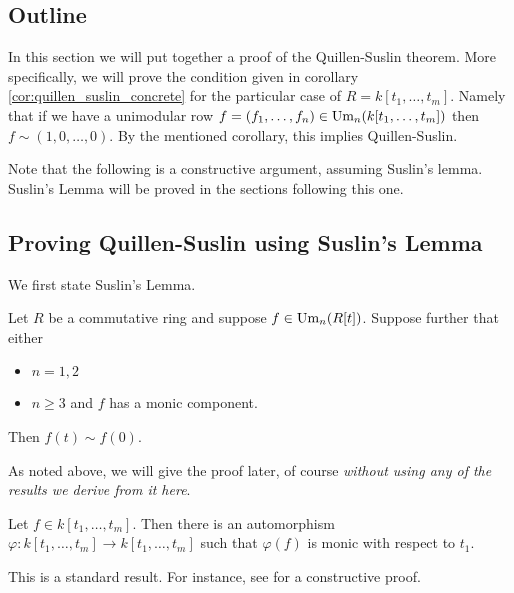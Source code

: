\subsection{Outline}
In this section we will put together a proof of the Quillen-Suslin theorem.
More specifically, we will prove the condition given in corollary \ref{cor:quillen_suslin_concrete} for the particular case of $R = k[t_1, \dots, t_m]$.
Namely that if we have a
unimodular row $f = (f_1, \dots, f_n) \in \text{Um}_n(k[t_1, \dots, t_m])$ then $f \sim (1,0,\dots,0)$.
By the mentioned corollary, this implies Quillen-Suslin.

Note that the following is a constructive argument, assuming Suslin's lemma.
Suslin's Lemma will be proved in the sections following this one.

\subsection{Proving Quillen-Suslin using Suslin's Lemma}

We first state Suslin's Lemma.

\begin{lemma}\label{lemma:suslinslemma}
  Let $R$ be a commutative ring and suppose $f \in \text{Um}_n(R[t])$. 
  Suppose further that either
  \begin{itemize}
    \item $n = 1,2$
    \item $n \geq 3$ and $f$ has a monic component.
  \end{itemize}
  Then $f(t) \sim f(0)$.
\end{lemma}

As noted above, we will give the proof later, of course \emph{without using any of the results we derive from it here}.


\begin{lemma}[Nagata]
\label{lemma:nagata}
  Let $f \in k[t_1,\dots,t_m]$.
  Then there is an automorphism $\varphi: k[t_1,\dots,t_m] \rightarrow k[t_1,\dots,t_m]$ such that
  $\varphi(f)$ is monic with respect to $t_1$.
\end{lemma}

This is a standard result.
For instance, see \citep[p. ~103]{lam06} for a constructive proof.

